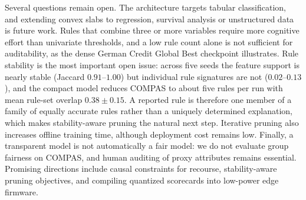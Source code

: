 Several questions remain open. The architecture targets tabular classification, and
extending convex slabs to regression, survival analysis or unstructured data is
future work. Rules that combine three or more variables require more cognitive
effort than univariate thresholds, and a low rule count alone is not sufficient
for auditability, as the dense German Credit Global Best checkpoint illustrates.
Rule stability is the most important open issue: across five seeds the feature
support is nearly stable (Jaccard $0.91$--$1.00$) but individual rule signatures
are not ($0.02$--$0.13$), and the compact model reduces COMPAS to about five rules
per run with mean rule-set overlap $0.38 \pm 0.15$. A reported rule is therefore
one member of a family of equally accurate rules rather than a uniquely determined
explanation, which makes stability-aware pruning the natural next step. Iterative
pruning also increases offline training time, although deployment cost remains
low. Finally, a transparent model is not automatically a fair model: we do not
evaluate group fairness on COMPAS, and human auditing of proxy attributes remains
essential. Promising directions include causal constraints for recourse,
stability-aware pruning objectives, and compiling quantized scorecards into
low-power edge firmware.
